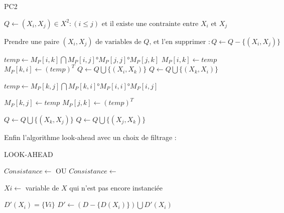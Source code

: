 \documentclass[12pt]{report}
\begin{document}
		\begin{algorithm}[H]
		\caption{PC2}
		
		
		$Q \gets {(X_i,X_j) \in X^2 : (i \leq j) \text{ et il existe une contrainte entre } X_i \text{ et } X_j}$\;
		
		{
			$\text{Prendre une paire } (X_i,X_j) \text{ de variables de } Q\text{, et l’en supprimer }: Q \gets Q - \lbrace(X_i,X_j)\rbrace$\;
		}
		
		{
			$temp \gets M_P[i,k] \bigcap M_P[i,j]°M_P[j,j]°M_P[j,k]$\;
			{
				$M_P[i,k] \gets temp$\;
				$M_P[k,i] \gets (temp)^T$\;
				{$ Q\gets Q \bigcup \lbrace(X_i,X_k)\rbrace $\;}
				{$ Q\gets Q \bigcup \lbrace(X_k,X_i)\rbrace $\;}
			}
		
			$temp \gets M_P[k,j] \bigcap M_P[k,i]°M_P[i,i]°M_P[i,j]$\;
			{
				$M_P[k,j] \gets temp$\;
				$M_P[j,k] \gets (temp)^T$\;
				
				{$ Q\gets Q \bigcup \lbrace(X_k,X_j)\rbrace $\;}
				{$ Q\gets Q \bigcup \lbrace(X_j,X_k)\rbrace $\;}
			}
		}
		
		
		\;
	\end{algorithm}

	\par 
	Enfin l'algorithme look-ahead avec un choix de filtrage : \\
	\begin{algorithm}[H]
		\caption{LOOK-AHEAD}
		
		
		
		$Consistance \gets $  OU $Consistance \gets $  \; 
		
		{
			\;
		}
	
		{
			\;
		}
		{
			 $Xi \gets $ variable de $X$ qui n’est pas encore instanciée\;
			 	
			 {
			 	$D\prime (X_i)=\lbrace Vi \rbrace$\;
			 	$D\prime \gets (D - \lbrace D(X_i) \rbrace )\bigcup {D\prime (X_i)}$\;
			 	{
			 		\;
		 		}
			 }
		 \;
			
		}
	\end{algorithm}
	
\end{document}
